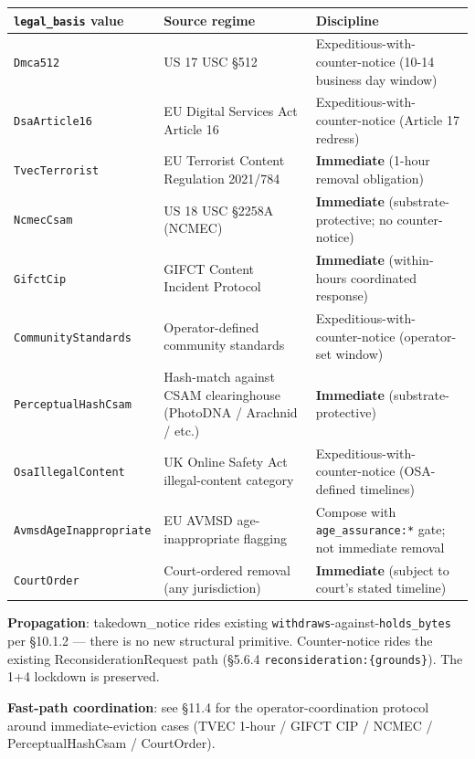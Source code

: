 \documentclass[10pt]{article}
\begin{document}
{\footnotesize
\begin{longtable}{|p{5.33cm}|p{5.33cm}|p{5.33cm}|}\hline
\textbf{\texttt{legal\_basis} value} & \textbf{Source regime} & \textbf{Discipline} \\ \hline\endhead
\texttt{Dmca512} & US 17 USC §512 & Expeditious-with-counter-notice (10-14 business day window) \\ \hline
\texttt{DsaArticle16} & EU Digital Services Act Article 16 & Expeditious-with-counter-notice (Article 17 redress) \\ \hline
\texttt{TvecTerrorist} & EU Terrorist Content Regulation 2021/784 & \textbf{Immediate} (1-hour removal obligation) \\ \hline
\texttt{NcmecCsam} & US 18 USC §2258A (NCMEC) & \textbf{Immediate} (substrate-protective; no counter-notice) \\ \hline
\texttt{GifctCip} & GIFCT Content Incident Protocol & \textbf{Immediate} (within-hours coordinated response) \\ \hline
\texttt{CommunityStandards} & Operator-defined community standards & Expeditious-with-counter-notice (operator-set window) \\ \hline
\texttt{PerceptualHashCsam} & Hash-match against CSAM clearinghouse (PhotoDNA / Arachnid / etc.) & \textbf{Immediate} (substrate-protective) \\ \hline
\texttt{OsaIllegalContent} & UK Online Safety Act illegal-content category & Expeditious-with-counter-notice (OSA-defined timelines) \\ \hline
\texttt{AvmsdAgeInappropriate} & EU AVMSD age-inappropriate flagging & Compose with \texttt{age\_assurance:*} gate; not immediate removal \\ \hline
\texttt{CourtOrder} & Court-ordered removal (any jurisdiction) & \textbf{Immediate} (subject to court's stated timeline) \\ \hline
\end{longtable}}


\textbf{Propagation}: takedown\_notice rides existing \texttt{withdraws}-against-\texttt{holds\_bytes} per §10.1.2 — there is no new structural primitive. Counter-notice rides the existing ReconsiderationRequest path (§5.6.4 \texttt{reconsideration:\{grounds\}}). The 1+4 lockdown is preserved.


\textbf{Fast-path coordination}: see §11.4 for the operator-coordination protocol around immediate-eviction cases (TVEC 1-hour / GIFCT CIP / NCMEC / PerceptualHashCsam / CourtOrder).
\end{document}
